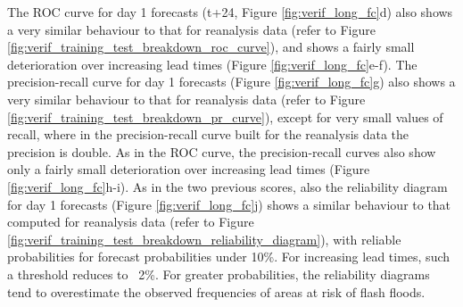 \documentclass[nhess, manuscript]{copernicus}
\begin{document}
The ROC curve for day 1 forecasts (t+24, Figure \ref{fig:verif_long_fc}d) also shows a very similar behaviour to that for reanalysis data (refer to Figure \ref{fig:verif_training_test_breakdown_roc_curve}), and shows a fairly small deterioration over increasing lead times (Figure \ref{fig:verif_long_fc}e-f). The precision-recall curve for day 1 forecasts (Figure \ref{fig:verif_long_fc}g) also shows a very similar behaviour to that for reanalysis data (refer to Figure \ref{fig:verif_training_test_breakdown_pr_curve}), except for very small values of recall, where in the precision-recall curve built for the reanalysis data the precision is double. As in the ROC curve, the precision-recall curves also show only a fairly small deterioration over increasing lead times (Figure \ref{fig:verif_long_fc}h-i). As in the two previous scores, also the reliability diagram for day 1 forecasts (Figure \ref{fig:verif_long_fc}j) shows a similar behaviour to that computed for reanalysis data (refer to Figure \ref{fig:verif_training_test_breakdown_reliability_diagram}), with reliable probabilities for forecast probabilities under 10\%. For increasing lead times, such a threshold reduces to ~2\%. For greater probabilities, the reliability diagrams tend to overestimate the observed frequencies of areas at risk of flash floods. 
\end{document}
